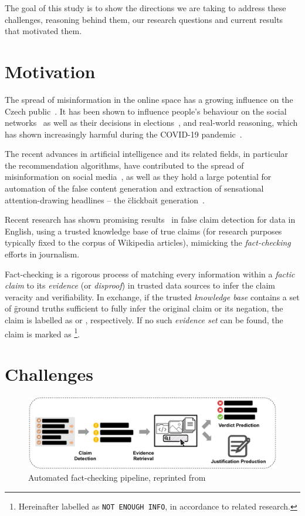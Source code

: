 The goal of this study is to show the directions we are taking to address these challenges, reasoning behind them, our research questions and current results that motivated them.

\section{Motivation}
\label{sec:motivation}

The spread of misinformation in the online space has a growing influence on the Czech public~\cite{stem}. It has been shown to influence people's behaviour on the social networks~\cite{Lazer1094} as well as their decisions in elections~\cite{10.1257/jep.31.2.211}, and real-world reasoning, which has shown increasingly harmful during the COVID-19 pandemic~\cite{BARUA2020100119}.

The recent advances in artificial intelligence and its related fields, in particular the recommendation algorithms, have contributed to the spread of misinformation on social media~\cite{doi:10.1177/2056305119888654}, as well as they hold a large potential for automation of the false content generation and extraction of sensational attention-drawing headlines -- the \"{clickbait} generation~\cite{shukai}.

Recent research has shown promising results~\cite{fever2} in false claim detection for data in English, using a trusted knowledge base of true claims (for research purposes typically fixed to the corpus of \textsf{Wikipedia} articles), mimicking the \textit{fact-checking} efforts in journalism.

Fact-checking is a rigorous process of matching every information within a \textit{factic claim} to its \textit{evidence} (or \textit{disproof}) in trusted data sources to infer the claim veracity and verifiability. In exchange, if the trusted \textit{knowledge base} contains a set of \"{ground truths} sufficient to fully infer the original claim or its negation, the claim is labelled as {} or {}, respectively. If no such \textit{evidence set} can be found, the claim is marked as {}\footnote{Hereinafter labelled as \texttt{NOT ENOUGH INFO}, in accordance to related research.}.


\section{Challenges}

\begin{figure}
    \includegraphics[width=14cm]{fig/framework.pdf}
    \caption{Automated fact-checking pipeline, reprinted from~\cite{guo-etal-2022-survey}}
    \label{fig:framework}
\end{figure}

